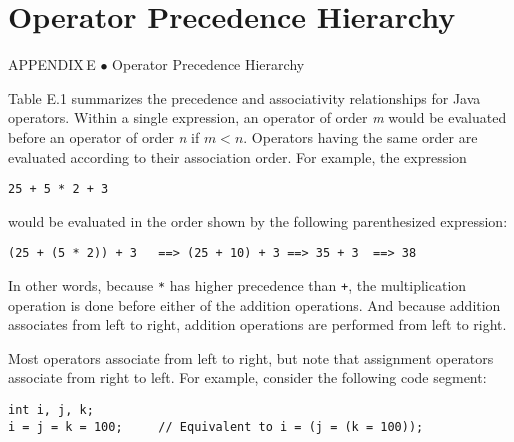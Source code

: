 \setcounter{table}{0}
\setcounter{figure}{0}
\renewcommand{\thetable}{\mbox{E.\arabic{table}}}%
\renewcommand{\thefigure}{\mbox{E--\arabic{figure}}}%


\chapter{Operator Precedence Hierarchy}

{{\color{cyan}APPENDIX\,E\,\,$\bullet$\,\,}Operator Precedence Hierarchy}


\noindent Table E.1 summarizes the precedence and
associativity relationships for Java operators.   Within a single
expression, an operator of order {\it m} would be evaluated before an
operator of order {\it n} if $m < n$. Operators having the same order
are evaluated according to their association order.  For example, the
expression

\begin{jjjlisting}
\begin{lstlisting}
25 + 5 * 2 + 3
\end{lstlisting}
\end{jjjlisting}

\noindent would be evaluated in the order shown by the following
parenthesized expression:

\begin{jjjlisting}
\begin{lstlisting}
(25 + (5 * 2)) + 3   ==> (25 + 10) + 3 ==> 35 + 3  ==> 38
\end{lstlisting}
\end{jjjlisting}

\noindent In other words, because \verb|*| has higher precedence
than \verb|+|, the multiplication operation is done before either of
the addition operations.   And because addition associates from left to
right, addition operations are performed from left to right.



Most operators associate from left to right, but note that assignment
operators associate from right to left.   For example, consider the
following code segment:

\begin{jjjlisting}
\begin{lstlisting}
int i, j, k;
i = j = k = 100;     // Equivalent to i = (j = (k = 100));
\end{lstlisting}
\end{jjjlisting}

